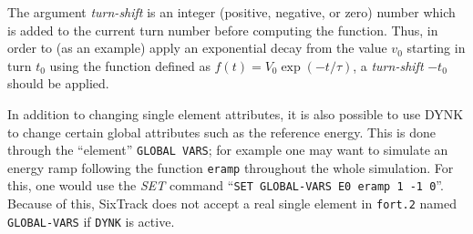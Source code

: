 \documentclass[a4paper,11pt]{report}
\begin{document}
The argument \emph{turn-shift} is an integer (positive, negative, or zero) number which is added to the current turn number before computing the function.
Thus, in order to (as an example) apply an exponential decay from the value $v_0$ starting in turn $t_0$ using the function defined as $f(t) = V_0 \exp(-t/\tau)$,
a \emph{turn-shift} $-t_0$ should be applied.

In addition to changing single element attributes, it is also possible to use DYNK to change certain global attributes such as the reference energy.
This is done through the ``element'' \texttt{GLOBAL VARS}; for example one may want to simulate an energy ramp following the function \texttt{eramp} throughout the whole simulation.
For this, one would use the \emph{SET} command ``\texttt{SET GLOBAL-VARS E0 eramp 1 -1 0}''.
Because of this, SixTrack does not accept a real single element in \texttt{fort.2} named \texttt{GLOBAL-VARS} if \texttt{DYNK} is active.
\end{document}
